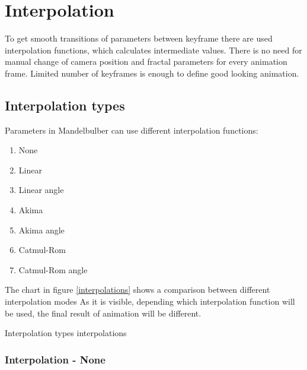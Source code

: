 \section{Interpolation}\label{interpolation}

To get smooth transitions of parameters between keyframe there are used
interpolation functions, which calculates intermediate values. There is no need
for manual change of camera position and fractal parameters for every animation
frame. Limited number of keyframes is enough to define good looking animation.

\subsection{Interpolation types}\label{interpolation-types}

Parameters in Mandelbulber can use different interpolation functions:

\begin{multicols}{3}
\begin{enumerate}
	
	\item None

	\item Linear

	\item Linear angle
	
	\item Akima	

	\item Akima angle
	
	\item Catmul-Rom

	\item Catmul-Rom angle
	
\end{enumerate}
\end{multicols}

The chart in figure \ref{interpolations} shows a comparison between different interpolation modes
As it is visible, depending which interpolation function will be used, the
final result of animation will be different.

{Interpolation types}
{interpolations}

\subsubsection{Interpolation - None}\label{interpolation-none}

